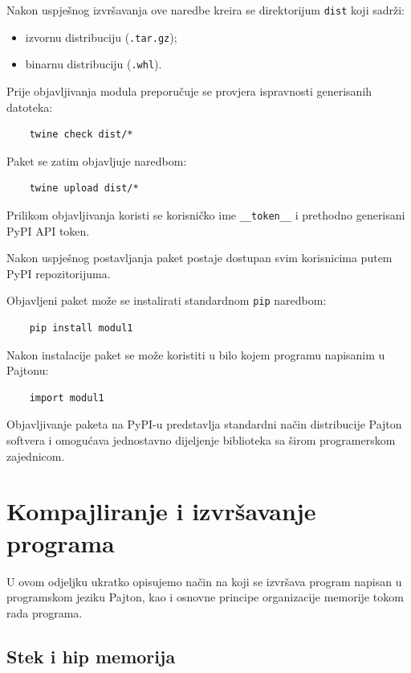 Nakon uspješnog izvršavanja ove naredbe kreira se direktorijum \texttt{dist} koji sadrži:

\begin{itemize}
	\item izvornu distribuciju (\texttt{.tar.gz});
	\item binarnu distribuciju (\texttt{.whl}).
\end{itemize}


Prije objavljivanja modula preporučuje se provjera ispravnosti generisanih datoteka:

\begin{verbatim}
	twine check dist/*
\end{verbatim}

Paket se zatim objavljuje naredbom:

\begin{verbatim}
	twine upload dist/*
\end{verbatim}

Prilikom objavljivanja koristi se korisničko ime \texttt{\_\_token\_\_} i prethodno generisani PyPI API token.

Nakon uspješnog postavljanja paket postaje dostupan svim korisnicima putem PyPI repozitorijuma.


Objavljeni paket može se instalirati standardnom \texttt{pip} naredbom:

\begin{verbatim}
	pip install modul1
\end{verbatim}

Nakon instalacije paket se može koristiti u bilo kojem programu napisanim u Pajtonu:
\begin{verbatim}
	import modul1
\end{verbatim}

Objavljivanje paketa na PyPI-u predstavlja standardni način distribucije Pajton softvera i omogućava jednostavno dijeljenje biblioteka sa širom programerskom zajednicom.

\section{Kompajliranje i izvršavanje programa}

U ovom odjeljku ukratko opisujemo način na koji se izvršava program napisan u programskom jeziku Pajton, kao i osnovne principe organizacije memorije tokom rada programa.

\subsection{Stek i hip memorija}

